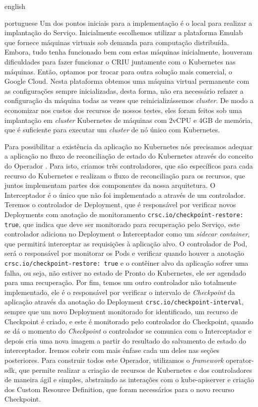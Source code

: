 \begin{otherlanguage*}{english}
\begin{otherlanguage*}{portuguese}
Um dos pontos iniciais para a implementação é o local para realizar a implantação do
Serviço. Inicialmente escolhemos utilizar a plataforma Emulab \cite{White+:osdi02}
que fornece máquinas virtuais sob demanda para computação distribuída. Embora, tudo
tenha funcionado bem com estas máquinas inicialmente, houveram dificuldades para
fazer funcionar o CRIU juntamente com o Kubernetes nas máquinas. Então, optamos por
trocar para outra solução mais comercial, o Google Cloud. Nesta plataforma obtemos
uma máquina virtual permanente com as configurações sempre inicializadas,
desta forma, não era necessário refazer a configuração
da máquina todas as vezes que reinicializássemos \textit{cluster}. De modo a economizar
nos custos dos recursos de nossos testes, eles foram feitos sob uma implantação em
\textit{cluster} Kubernetes de máquinas com 2vCPU e 4GB de memória, que é suficiente
para executar um \textit{cluster} de nó único com Kubernetes.

Para possibilitar a existência da aplicação no Kubernetes nós precisamos adequar a
aplicação no fluxo de reconciliação de estado do Kubernetes através do conceito do Operador
\cite{kubernetes:operator}. Para isto, criamos três controladores, que são específicos para
cada recurso do Kubernetes e realizam o fluxo de reconciliação para os recursos, que juntos
implementam partes dos componentes da nossa arquitetura. O Interceptador é o único que não
foi implementado a através de um controlador. Teremos o controlador de Deployment, que é
responsável por verificar novos Deployments com anotação de monitoramento
\texttt{crsc.io/checkpoint-restore: true}, que indica que deve ser monitorado para
recuperação pelo Serviço, este controlador adiciona no Deployment o Interceptador como
um \textit{sidecar container}, que permitirá interceptar as requisições à aplicação alvo.
O controlador de Pod, será o responsável por monitorar os Pods e verificar quando houver a
anotação \texttt{crsc.io/checkpoint-restore: true} e o contêiner alvo da aplicação sofrer
uma falha, ou seja, não estiver no estado de Pronto do Kubernetes, ele ser agendado para
uma recuperação. Por fim, temos um outro controlador não totalmente
implementado, ele é o responsável por verificar o intervalo de \textit{Checkpoint} da
aplicação através da anotação do Deployment \texttt{crsc.io/checkpoint-interval}, sempre
que um novo Deployment monitorado for identificado, um recurso de Checkpoint é criado, e este
é monitorado pelo controlador do Checkpoint, quando se dá o momento do \textit{Checkpoint}
o controlador se comunica com o Interceptador e depois cria uma nova imagem a partir do
resultado do salvamento de estado do interceptador. Iremos cobrir com mais ênfase cada um
deles nas seções posteriores. Para construir todos este Operador, utilizamos o \textit{framework}
operator-sdk, que permite realizar a criação de recursos de Kubernetes e dos controladores
de maneira ágil e simples, abstraindo as interações com o kube-apiserver e criação dos
Custom Resource Definition, que foram necessários para o novo recurso Checkpoint.


\end{otherlanguage*}
\end{otherlanguage*}

